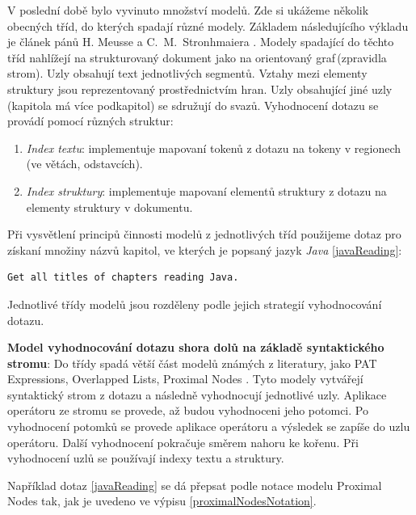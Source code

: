 V poslední době bylo vyvinuto množství modelů. Zde si ukážeme několik obecných tříd, do kterých spadají různé modely. Základem následujícího výkladu je článek pánů H. Meusse a C.~M.~Stronhmaiera \cite{meuss1999improving}. Modely spadající do těchto tříd nahlížejí na strukturovaný dokument jako na orientovaný graf\,(zpravidla strom). Uzly obsahují text jednotlivých segmentů. Vztahy mezi elementy struktury jsou reprezentovaný prostřednictvím hran. Uzly obsahující jiné uzly\,(kapitola má více podkapitol) se sdružují do svazů. Vyhodnocení dotazu se provádí pomocí různých struktur:
\begin{enumerate}
\item \emph{Index textu}: implementuje mapovaní tokenů z dotazu na tokeny v regionech\,(ve větách, odstavcích).

\item \emph{Index struktury}: implementuje mapovaní elementů struktury z dotazu na elementy struktury v dokumentu.
\end{enumerate}


Při vysvětlení principů činnosti modelů z jednotlivých tříd použijeme dotaz pro získaní množiny názvů kapitol, ve kterých je popsaný jazyk \emph{Java} \ref{javaReading}:


\begin{lstlisting}[label=javaReading, caption={Vzorový dotaz}, captionpos=b]
		    Get all titles of chapters reading Java.
\end{lstlisting}
Jednotlivé třídy modelů jsou rozděleny podle jejich strategií vyhodnocování dotazu.

\textbf{Model vyhodnocování dotazu shora dolů na základě syntaktického stromu}: Do třídy spadá větší část modelů známých z literatury, jako PAT Expressions, Overlapped Lists, Proximal Nodes \cite{baeza1996integrating}. Tyto modely vytvářejí syntaktický strom z dotazu a následně vyhodnocují jednotlivé uzly. Aplikace operátoru ze stromu se provede, až budou vyhodnoceni jeho potomci. Po vyhodnocení potomků  se provede aplikace operátoru a výsledek se zapíše do uzlu operátoru. Další vyhodnocení pokračuje směrem nahoru ke kořenu. Při vyhodnocení uzlů se používají indexy textu a struktury.

Například dotaz \ref{javaReading} se dá přepsat podle notace modelu Proximal Nodes tak, jak je uvedeno ve výpisu \ref{proximalNodesNotation}.


